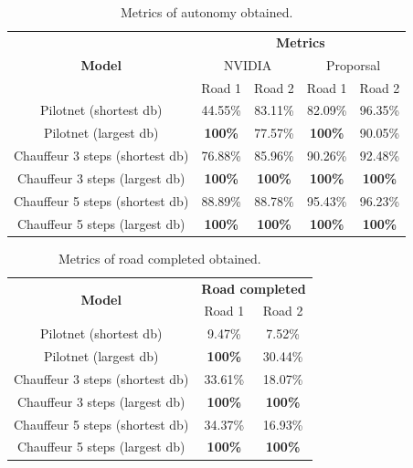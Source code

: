 \documentclass{cys}
\begin{document}
\begin{table}[H]
	\caption{Metrics of autonomy obtained.}
	\begin{center}
		\begin{tabular}{|c|c|c|c|c|}
			\hline
			\multirow{3}{*}{\textbf{Model}} & \multicolumn{4}{|c|}{\textbf{Metrics}} \\\cline{2-5} 
			& \multicolumn{2}{|c|}{NVIDIA} & \multicolumn{2}{|c|}{Proporsal} \\\cline{2-5} 
			& Road 1 & Road 2 & Road 1 & Road 2 \\\hline \hline
			
			Pilotnet (shortest db) & 44.55\% & 83.11\% & 82.09\% & 96.35\% \\\hline
			Pilotnet (largest db) & \textbf{100\%} & 77.57\% & \textbf{100\%} & 90.05\% \\\hline
			Chauffeur 3 steps (shortest db) & 76.88\% & 85.96\% & 90.26\% & 92.48\% \\\hline
			Chauffeur 3 steps (largest db) & \textbf{100\%} & \textbf{100\%}   & \textbf{100\%} & \textbf{100\%} \\\hline
			Chauffeur 5 steps (shortest db)& 88.89\% & 88.78\% & 95.43\% & 96.23\% \\\hline
			Chauffeur 5 steps  (largest db)& \textbf{100\%} & \textbf{100\%} & \textbf{100\%} & \textbf{100\%} \\\hline
		\end{tabular}
		\label{table:autonomy}
	\end{center}
\end{table}

\begin{table}[H]
	\caption{Metrics of road completed obtained.}
	\begin{center}
		\begin{tabular}{|c|c|c|}
			\hline
			\multirow{2}{*}{\textbf{Model}} & \multicolumn{2}{|c|}{\textbf{Road completed}} \\\cline{2-3} 
			& Road 1 & Road 2 \\\hline \hline
			
			Pilotnet (shortest db) & 9.47\% & 7.52\% \\\hline
			Pilotnet (largest db) & \textbf{100\%} & 30.44\% \\\hline
			Chauffeur 3 steps (shortest db) & 33.61\% & 18.07\% \\\hline
			Chauffeur 3 steps (largest db) & \textbf{100\%} & \textbf{100\%} \\\hline
			Chauffeur 5 steps (shortest db) & 34.37\% & 16.93\% \\\hline
			Chauffeur 5 steps (largest db) & \textbf{100\%} & \textbf{100\%} \\\hline
		\end{tabular}
		\label{table:read}
	\end{center}
\end{table}
\end{document}
